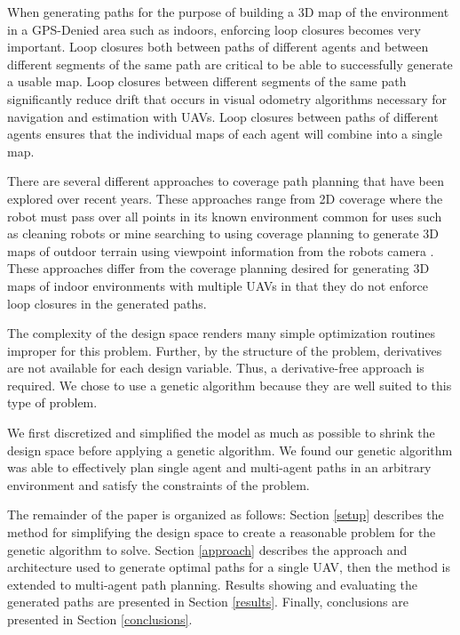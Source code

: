 \documentclass[letterpaper, 10 pt, conference]{ieeeconf}  %
\begin{document}
When generating paths for the purpose of building a 3D map of the environment in a GPS-Denied area such as indoors, enforcing loop closures becomes very important. Loop closures both between paths of different agents and between different segments of the same path are critical to be able to successfully generate a usable map. Loop closures between different segments of the same path significantly reduce drift that occurs in visual odometry algorithms necessary for navigation and estimation with UAVs. Loop closures between paths of different agents ensures that the individual maps of each agent will combine into a single map.

There are several different approaches to coverage path planning that have been explored over recent years. These approaches range from 2D coverage where the robot must pass over all points in its known environment common for uses such as cleaning robots or mine searching \cite{Choset2001} to using coverage planning to generate 3D maps of outdoor terrain using viewpoint information from the robots camera \cite{Bircher2016}. These approaches differ from the coverage planning desired for generating 3D maps of indoor environments with multiple UAVs in that they do not enforce loop closures in the generated paths.

The complexity of the design space renders many simple optimization routines improper for this problem. Further, by the structure of the problem, derivatives are not available for each design variable. Thus, a derivative-free approach is required. We chose to use a genetic algorithm because they are well suited to this type of problem.

We first discretized and simplified the model as much as possible to shrink the design space before applying a genetic algorithm. We found our genetic algorithm was able to effectively plan single agent and multi-agent paths in an arbitrary environment and satisfy the constraints of the problem.

The remainder of the paper is organized as follows: Section \ref{setup} describes the method for simplifying the design space to create a reasonable problem for the genetic algorithm to solve. Section \ref{approach} describes the approach and architecture used to generate optimal paths for a single UAV, then the method is extended to multi-agent path planning.
Results showing and evaluating the generated paths are presented in Section \ref{results}. Finally, conclusions are presented in Section \ref{conclusions}.
\end{document}
